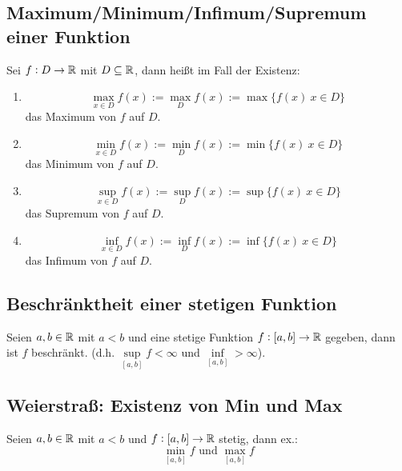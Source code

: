 \subsection{Maximum/Minimum/Infimum/Supremum einer Funktion}
Sei $f: D \rightarrow \mathbb{R}$ mit $D \subseteq \mathbb{R}$, dann heißt im Fall der
Existenz:
\begin{enumerate}[label= (\alph*)]
    \item
        \begin{equation*}
            \max\limits_{x \in D} f(x)
            := \max\limits_{D} f(x) := \max \{ f(x)\ x \in D \}
        \end{equation*}
        das Maximum von $f$ auf $D$.
    \item
        \begin{equation*}
            \min\limits_{x \in D} f(x) := \min\limits_{D} f(x)
            := \min \{ f(x)\ x \in D \}
        \end{equation*}
        das Minimum von $f$ auf $D$.
    \item
        \begin{equation*}
            \sup\limits_{x \in D} f(x)
            := \sup\limits_{D} f(x) := \sup \{ f(x)\ x \in D \}
        \end{equation*}
        das Supremum von $f$ auf $D$.
    \item
        \begin{equation*}
            \inf\limits_{x \in D} f(x) := \inf\limits_{D} f(x)
            := \inf \{ f(x)\ x \in D \}
        \end{equation*}
        das Infimum von $f$ auf $D$.
\end{enumerate}

\subsection{Beschränktheit einer stetigen Funktion}
Seien $a, b \in \mathbb{R}$ mit $a < b$ und eine stetige Funktion
$f: [a, b] \rightarrow \mathbb{R}$ gegeben, dann ist $f$ beschränkt.
(d.h. $\sup\limits_{[a, b]} f < \infty$ und $\inf\limits_{[a, b]} > \infty$).

\subsection{Weierstraß: Existenz von Min und Max}
Seien $a, b \in \mathbb{R}$ mit $a < b$ und $f: [a, b] \rightarrow \mathbb{R}$ stetig,
dann ex.:
\begin{equation*}
    \min_{[a, b]} f \text{ und } \max_{[a, b]} f
\end{equation*}
